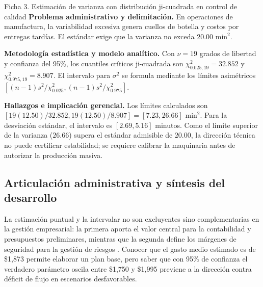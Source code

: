 {
\begin{fichainvestigacion}{Ficha 3. Estimación de varianza con distribución ji-cuadrada en control de calidad}
\textbf{Problema administrativo y delimitación.} En operaciones de manufactura, la variabilidad excesiva genera cuellos de botella y costos por entregas tardías. El estándar exige que la varianza no exceda $20.00\text{ min}^2$.

\textbf{Metodología estadística y modelo analítico.} Con $\nu = 19$ grados de libertad y confianza del 95\%, los cuantiles críticos ji-cuadrada son $\chi^2_{0.025, 19} = 32.852$ y $\chi^2_{0.975, 19} = 8.907$. El intervalo para $\sigma^2$ se formula mediante los límites asimétricos $[(n-1)s^2 / \chi^2_{0.025}, (n-1)s^2 / \chi^2_{0.975}]$.

\textbf{Hallazgos e implicación gerencial.} Los límites calculados son $[19(12.50)/32.852, 19(12.50)/8.907] = [7.23, 26.66]\text{ min}^2$. Para la desviación estándar, el intervalo es $[2.69, 5.16]$ minutos. Como el límite superior de la varianza ($26.66$) supera el estándar admisible de $20.00$, la dirección técnica no puede certificar estabilidad; se requiere calibrar la maquinaria antes de autorizar la producción masiva.
\end{fichainvestigacion}

\subsection{Articulación administrativa y síntesis del desarrollo}
La estimación puntual y la intervalar no son excluyentes sino complementarias en la gestión empresarial: la primera aporta el valor central para la contabilidad y presupuestos preliminares, mientras que la segunda define los márgenes de seguridad para la gestión de riesgos \citep{holmesBusiness2023}. Conocer que el gasto medio estimado es de \$1,873 permite elaborar un plan base, pero saber que con 95\% de confianza el verdadero parámetro oscila entre \$1,750 y \$1,995 previene a la dirección contra déficit de flujo en escenarios desfavorables.

}
